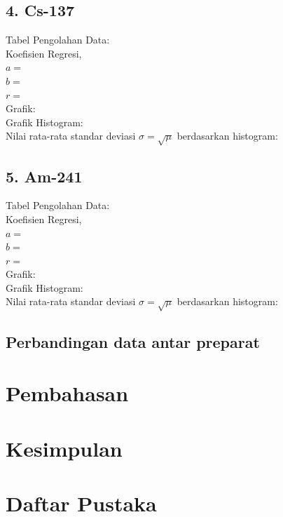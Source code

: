 \documentclass{article}
\begin{document}
			\subsection*{4. Cs-137}
			Tabel Pengolahan Data:\\
			Koefisien Regresi,\\
			$a = $ \\
			$b = $ \\
			$r = $ \\
			Grafik: \\
			Grafik Histogram: \\
			Nilai rata-rata standar deviasi $\sigma = \sqrt{\mu}$ berdasarkan histogram:\\
		
			\subsection*{5. Am-241}
			Tabel Pengolahan Data:\\
			Koefisien Regresi,\\
			$a = $ \\
			$b = $ \\
			$r = $ \\
			Grafik: \\
			Grafik Histogram: \\
			Nilai rata-rata standar deviasi $\sigma = \sqrt{\mu}$ berdasarkan histogram:\\
			
			\subsection*{Perbandingan data antar preparat}
			
	
	\section*{Pembahasan}
	
	\section*{Kesimpulan}
	
	\section*{Daftar Pustaka}
	
	
\end{document}
